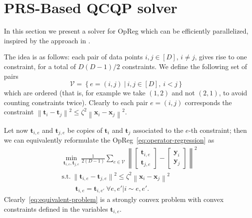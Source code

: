 \documentclass{article}
\newcommand{\norm}[1]{\left\lVert#1\right\rVert}
\newcommand{\tv}{\mathbold{t}}
\newcommand{\x}{\mathbold{x}}
\newcommand{\y}{\mathbold{y}}
\begin{document}




\appendix

\section{PRS-Based QCQP solver}
In this section we present a solver for OpReg which can be efficiently parallelized, inspired by the approach in \cite{simonetto_smooth_2021}.

The idea is as follows: each pair of data points $i, j \in [D]$, $i \neq j$, gives rise to one constraint, for a total of $D(D-1)/2$ constraints. We define the following set of pairs
$$
	\mathcal{V} = \left\{ e = (i,j) \ | \ i, j \in [D], \ i < j \right\}
$$
which are ordered (that is, for example we take $(1,2)$ and not $(2,1)$, to avoid counting constraints twice). Clearly to each pair $e = (i,j)$ corresponds the constraint $\norm{\tv_i - \tv_j}^2 \leq \zeta^2 \norm{\x_i - \x_j}^2$.

Let now $\tv_{i,e}$ and $\tv_{j,e}$ be copies of $\tv_i$ and $\tv_j$ associated to the $e$-th constraint; then we can equivalently reformulate the OpReg~\eqref{eq:operator-regression} as
\begin{subequations}\label{eq:equivalent-problem}
\begin{align}
	&\min_{\tv_{i,e}, \tv_{j,e}} \frac{1}{2 (D-1)} \sum_{e \in \mathcal{V}} \norm{\begin{bmatrix} \tv_{i,e} \\ \tv_{j,e} \end{bmatrix} - \begin{bmatrix} \y_i \\ \y_j \end{bmatrix}}^2 \\
	&\text{s.t.} \ \norm{\tv_{i,e} - \tv_{j,e}}^2 \leq \zeta^2 \norm{\x_i - \x_j}^2 \label{eq:interpolation-constraints} \\
	&\qquad \tv_{i,e} = \tv_{i,e'} \ \forall e, e' | i \sim e, e'. \label{eq:consensus-constraints}
\end{align}
\end{subequations}
Clearly~\eqref{eq:equivalent-problem} is a strongly convex problem with convex constraints defined in the variables $\tv_{i,e}$.

\end{document}

